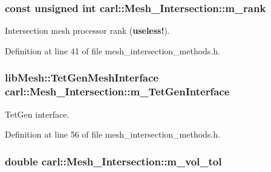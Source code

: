 \subsubsection[{m\+\_\+rank}]{\setlength{\rightskip}{0pt plus 5cm}const unsigned int carl\+::\+Mesh\+\_\+\+Intersection\+::m\+\_\+rank\hspace{0.3cm}{\ttfamily [protected]}}\label{classcarl_1_1_mesh___intersection_ab2543dd7c6f2d62561e4b75782621f43}


Intersection mesh processor rank ({\bfseries useless!}). 



Definition at line 41 of file mesh\+\_\+intersection\+\_\+methods.\+h.

\hypertarget{classcarl_1_1_mesh___intersection_a670d0e1f635a8fd820fb659c4c073c0e}{}
\subsubsection[{m\+\_\+\+Tet\+Gen\+Interface}]{\setlength{\rightskip}{0pt plus 5cm}lib\+Mesh\+::\+Tet\+Gen\+Mesh\+Interface carl\+::\+Mesh\+\_\+\+Intersection\+::m\+\_\+\+Tet\+Gen\+Interface\hspace{0.3cm}{\ttfamily [protected]}}\label{classcarl_1_1_mesh___intersection_a670d0e1f635a8fd820fb659c4c073c0e}


Tet\+Gen interface. 



Definition at line 56 of file mesh\+\_\+intersection\+\_\+methods.\+h.

\hypertarget{classcarl_1_1_mesh___intersection_ad282e724c75087a90026854992ec0809}{}
\subsubsection[{m\+\_\+vol\+\_\+tol}]{\setlength{\rightskip}{0pt plus 5cm}double carl\+::\+Mesh\+\_\+\+Intersection\+::m\+\_\+vol\+\_\+tol\hspace{0.3cm}{\ttfamily [protected]}}\label{classcarl_1_1_mesh___intersection_ad282e724c75087a90026854992ec0809}


